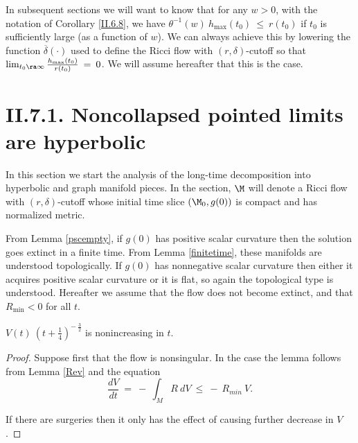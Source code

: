 \begin{remark}
  \label{rem:kl-earlier-scalar-curvature-bounds-smaller-balls-from-lower-curvature-bound-structural-remark-scalar-curvature}
 \label{hmax}
In subsequent sections we will want to know that for any
$w > 0$, with the notation
of Corollary \ref{II.6.8}, we have
$\theta^{-1}(w) \: h_{\max}(t_0) \: \le \: r(t_0)$ if $t_0$ is
sufficiently large (as a function of $w$).
We can always achieve this by lowering the function $\overline{\delta}(\cdot)$
used to define the Ricci flow with $(r, \delta)$-cutoff so that
$\lim_{t_0 \ra \infty} \frac{h_{\max}(t_0)}{r(t_0)} \: = \: 0$.
We will assume hereafter that this is the case.
\end{remark}

\section{II.7.1. Noncollapsed pointed limits are hyperbolic} \label{II.7.1}

In this section we start the analysis of the long-time decomposition
into hyperbolic and graph manifold pieces. In the section,
$\M$ will denote a Ricci flow with $(r,\delta)$-cutoff whose initial time slice
$(\M_0, g(0))$ is compact and has normalized metric.

From Lemma \ref{pscempty}, if
$g(0)$ has positive scalar curvature then the solution goes extinct
in a finite time.  From Lemma \ref{finitetime}, these manifolds are understood
topologically. If $g(0)$ has nonnegative scalar curvature then
either it acquires positive scalar curvature or it is flat, so again
the topological type is understood.
Hereafter we assume that the flow
does not become extinct, and
that $R_{\min}<0$ for all $t$.

\begin{lemma}
  \label{lem:kl-noncollapsed-pointed-limits-hyperbolic-monotonicity-noncollapsing}

$V(t) \: \left( t + \frac14 \right)^{- \: \frac32}$ is nonincreasing in $t$.
\end{lemma}
\begin{proof}
Suppose first that the flow is nonsingular. In the case the lemma follows
from Lemma \ref{Rev} and the equation
\begin{equation} \label{dVdt}
\frac{dV}{dt} \: = \: - \: \int_M R \: dV \: \le \: - \: R_{min} \: V.
\end{equation}

If there are surgeries then it only has the effect of causing further
decrease in $V$.
\end{proof}

